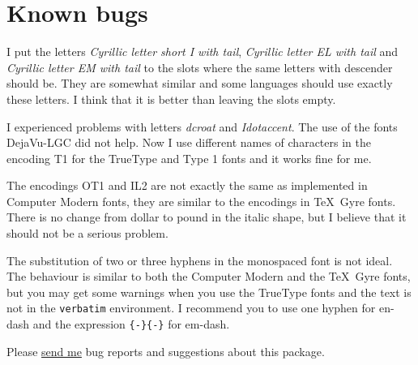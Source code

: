 \documentclass[oneside]{scrartcl}
\begin{document}
\section{Known bugs}

I put the letters \emph{Cyrillic letter short I with tail},
\emph{Cyrillic letter EL with tail} and \emph{Cyrillic
letter EM with tail} to the slots where the same letters with descender
should be. They are somewhat similar and some languages should use exactly
these letters. I think that it is better than leaving the slots empty.

I experienced problems with letters \emph{dcroat} and \emph{Idotaccent}.
The use of the fonts DejaVu-LGC did not help. Now
I use different names of characters in the encoding T1 for the TrueType and
Type 1 fonts and it works fine for me.

The encodings OT1 and IL2 are not exactly the same as implemented in Computer
Modern fonts, they are similar to the encodings in \TeX\ Gyre fonts. There
is no change from dollar to pound in the italic shape, but I believe that
it should not be a serious problem.

The substitution of two or three hyphens in the monospaced font is not ideal.
The behaviour is similar to both the Computer Modern and the \TeX\ Gyre fonts,
but you may get some warnings when you use the TrueType fonts and the text is
not in the \texttt{verbatim} environment. I recommend you to use one hyphen
for en-dash and the expression \texttt{\{-\}\{-\}} for em-dash.

Please \href{mailto:pavel.farar@centrum.cz}{send me} bug reports and
suggestions about this package.
\end{document}
